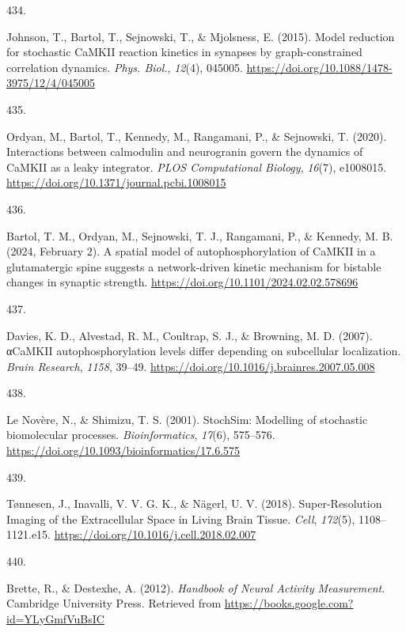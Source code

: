 \documentclass[
  11pt,
  letterpaper,
]{scrreprt}
\newlength{\cslhangindent}
\newlength{\csllabelwidth}
\newenvironment{CSLReferences}[2] %
 {\begin{list}{}{%
  \setlength{\itemindent}{0pt}
  \setlength{\leftmargin}{0pt}
  \setlength{\parsep}{0pt}
  \ifodd #1
   \setlength{\leftmargin}{\cslhangindent}
   \setlength{\itemindent}{-1\cslhangindent}
  \fi
  \setlength{\itemsep}{#2\baselineskip}}}
 {\end{list}}
\newcommand{\CSLLeftMargin}[1]{\parbox[t]{\csllabelwidth}{\strut#1\strut}}
\newcommand{\CSLRightInline}[1]{\parbox[t]{\linewidth - \csllabelwidth}{\strut#1\strut}}
\begin{document}
\begin{CSLReferences}{0}{0}
\CSLLeftMargin{434. }%
\CSLRightInline{Johnson, T., Bartol, T., Sejnowski, T., \& Mjolsness, E.
(2015). Model reduction for stochastic {CaMKII} reaction kinetics in
synapses by graph-constrained correlation dynamics. \emph{Phys. Biol.},
\emph{12}(4), 045005.
\url{https://doi.org/10.1088/1478-3975/12/4/045005}}

\CSLLeftMargin{435. }%
\CSLRightInline{Ordyan, M., Bartol, T., Kennedy, M., Rangamani, P., \&
Sejnowski, T. (2020). Interactions between calmodulin and neurogranin
govern the dynamics of {CaMKII} as a leaky integrator. \emph{PLOS
Computational Biology}, \emph{16}(7), e1008015.
\url{https://doi.org/10.1371/journal.pcbi.1008015}}

\CSLLeftMargin{436. }%
\CSLRightInline{Bartol, T. M., Ordyan, M., Sejnowski, T. J., Rangamani,
P., \& Kennedy, M. B. (2024, February 2). A spatial model of
autophosphorylation of {CaMKII} in a glutamatergic spine suggests a
network-driven kinetic mechanism for bistable changes in synaptic
strength. \url{https://doi.org/10.1101/2024.02.02.578696}}

\CSLLeftMargin{437. }%
\CSLRightInline{Davies, K. D., Alvestad, R. M., Coultrap, S. J., \&
Browning, M. D. (2007). {αCaMKII} autophosphorylation levels differ
depending on subcellular localization. \emph{Brain Research},
\emph{1158}, 39--49.
\url{https://doi.org/10.1016/j.brainres.2007.05.008}}

\CSLLeftMargin{438. }%
\CSLRightInline{Le Novère, N., \& Shimizu, T. S. (2001). {StochSim}:
Modelling of stochastic biomolecular processes. \emph{Bioinformatics},
\emph{17}(6), 575--576.
\url{https://doi.org/10.1093/bioinformatics/17.6.575}}

\CSLLeftMargin{439. }%
\CSLRightInline{Tønnesen, J., Inavalli, V. V. G. K., \& Nägerl, U. V.
(2018). Super-{Resolution Imaging} of the {Extracellular Space} in
{Living Brain Tissue}. \emph{Cell}, \emph{172}(5), 1108--1121.e15.
\url{https://doi.org/10.1016/j.cell.2018.02.007}}

\CSLLeftMargin{440. }%
\CSLRightInline{Brette, R., \& Destexhe, A. (2012). \emph{Handbook of
{Neural Activity Measurement}}. Cambridge University Press. Retrieved
from \url{https://books.google.com?id=YLyGmfVuBsIC}}


\end{CSLReferences}
\end{document}
